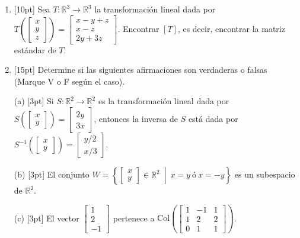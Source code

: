 \documentclass[11pt]{article}
\newcommand{\vf}{\fbox{V}\ \fbox{F}}
\begin{document}
\begin{enumerate}
\item{}[10pt] Sea $T:\mathbb{R}^3\to\mathbb{R}^3$ la transformación lineal dada por $T\left(\begin{bmatrix}x\\y\\z\end{bmatrix}\right)=\begin{bmatrix}x-y+z\\x-z\\2y+3z\end{bmatrix}$. Encontrar $[T]$, es decir, encontrar la matriz estándar de $T$.

\vspace{4pt}
\fbox{\begin{minipage}[t][3cm]{\dimexpr\linewidth-2\fboxsep-2\fboxrule}
$[T] = $
\end{minipage}}

\item{}[15pt] Determine si las siguientes afirmaciones son verdaderas o falsas (Marque V o F según el caso).

\vspace{6pt}
\noindent (a) [3pt] Si $S:\mathbb{R}^2\to\mathbb{R}^2$ es la transformación lineal dada por $S\left(\begin{bmatrix}x\\y\end{bmatrix}\right)=\begin{bmatrix}2y\\3x\end{bmatrix}$, entonces la inversa de $S$ está dada por $S^{-1}\left(\begin{bmatrix}x\\y\end{bmatrix}\right)=\begin{bmatrix}y/2\\x/3\end{bmatrix}$. \hfill\vf

\vspace{6pt}
\noindent (b) [3pt] El conjunto $W=\left\{\begin{bmatrix}x\\y\end{bmatrix}\in\mathbb{R}^2\ \middle|\ x=y\ \text{ó}\ x=-y\right\}$ es un subespacio de $\mathbb{R}^2$. \hfill\vf

\vspace{6pt}
\noindent (c) [3pt] El vector $\begin{bmatrix}1\\2\\-1\end{bmatrix}$ pertenece a $\mathrm{Col}\left(\begin{bmatrix}1&-1&1\\1&2&2\\0&1&1\end{bmatrix}\right)$. \hfill\vf


\end{enumerate}
\end{document}
